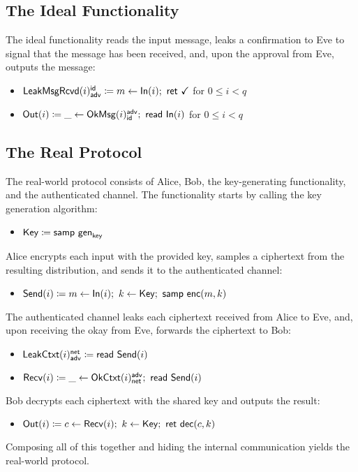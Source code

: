 \subsection{The Ideal Functionality}
The ideal functionality reads the input message, leaks a confirmation to Eve to signal that the message has been received, and, upon the approval from Eve, outputs the message:
\begin{itemize}
\item $\mathsf{LeakMsgRcvd}(i)^{\mathsf{id}}_{\mathsf{adv}} \coloneqq m \leftarrow \mathsf{In}(i); \ \mathsf{ret} \ \checkmark$ for $0 \leq i < q$
\item $\mathsf{Out}(i) \coloneqq \_ \leftarrow \mathsf{OkMsg}(i)^{\mathsf{adv}}_{\mathsf{id}}; \ \mathsf{read} \ \mathsf{In}(i)$ for $0 \leq i < q$
\end{itemize}

\subsection{The Real Protocol}
The real-world protocol consists of Alice, Bob, the key-generating functionality, and the authenticated channel. The functionality starts by calling the key generation algorithm:
\begin{itemize}
\item $\mathsf{Key} \coloneqq \mathsf{samp} \ \mathsf{gen}_{\mathsf{key}}$
\end{itemize}
Alice encrypts each input with the provided key, samples a ciphertext from the resulting distribution, and sends it to the authenticated channel: 
\begin{itemize}
\item $\mathsf{Send}(i) \coloneqq m \leftarrow \mathsf{In}(i); \ k \leftarrow \mathsf{Key}; \ \mathsf{samp} \ \mathsf{enc}(m,k)$
\end{itemize}
The authenticated channel leaks each ciphertext received from Alice to Eve, and, upon receiving the okay from Eve, forwards the ciphertext to Bob:
\begin{itemize}
\item $\mathsf{LeakCtxt}(i)^{\mathsf{net}}_{\mathsf{adv}} \coloneqq \mathsf{read} \ \mathsf{Send}(i)$
\item $\mathsf{Recv}(i) \coloneqq \_ \leftarrow \mathsf{OkCtxt}(i)^{\mathsf{adv}}_{\mathsf{net}}; \ \mathsf{read} \ \mathsf{Send}(i)$
\end{itemize}
Bob decrypts each ciphertext with the shared key and outputs the result:
\begin{itemize}
\item $\mathsf{Out}(i) \coloneqq c \leftarrow \mathsf{Recv}(i); \ k \leftarrow \mathsf{Key}; \ \mathsf{ret} \ \mathsf{dec}(c,k)$
\end{itemize}
Composing all of this together and hiding the internal communication yields the real-world protocol.

